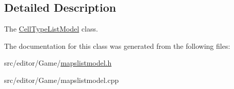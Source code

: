 \subsection{\-Detailed \-Description}
\-The \hyperlink{class_cell_type_list_model}{\-Cell\-Type\-List\-Model} class. 

\-The documentation for this class was generated from the following files\-:\begin{DoxyCompactItemize}
\item 
src/editor/\-Game/\hyperlink{mapslistmodel_8h}{mapslistmodel.\-h}\item 
src/editor/\-Game/mapslistmodel.\-cpp\end{DoxyCompactItemize}

